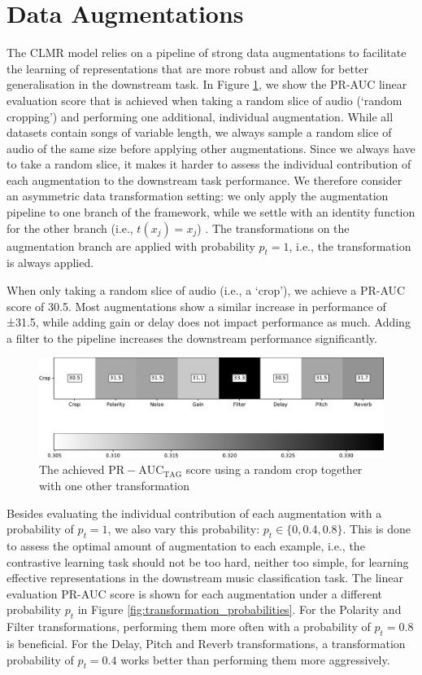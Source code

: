 \section{Data Augmentations}\label{sec:data_augmentations}
The CLMR model relies on a pipeline of strong data augmentations to facilitate the learning of representations that are more robust and allow for better generalisation in the downstream task.
In Figure \ref{fig:transformation_study}, we show the PR-AUC linear evaluation score that is achieved when taking a random slice of audio (`random cropping') and performing one additional, individual augmentation.
While all datasets contain songs of variable length, we always sample a random slice of audio of the same size before applying other augmentations.
Since we always have to take a random slice, it makes it harder to assess the individual contribution of each augmentation to the downstream task performance.
We therefore consider an asymmetric data transformation setting: we only apply the augmentation pipeline to one branch of the framework, while we settle with an identity function for the other branch (i.e., $t(x_j) = x_j$) \cite{chen_simple_2020}. The transformations on the augmentation branch are applied with probability $p_t=1$, i.e., the transformation is always applied.

When only taking a random slice of audio (i.e., a `crop'), we achieve a PR-AUC score of 30.5.
Most augmentations show a similar increase in performance of ±31.5, while adding gain or delay does not impact performance as much.
Adding a filter to the pipeline increases the downstream performance significantly.

\begin{figure}[h]
    \centering
    \includegraphics[width=\columnwidth]{figs/transformation_study.pdf}
    \caption{The achieved $\mathrm{PR-AUC}_{\mathrm{TAG}}$ score using a random crop together with one other transformation}
    \label{fig:transformation_study}
\end{figure}

Besides evaluating the individual contribution of each augmentation with a probability of $p_t = 1$, we also vary this probability: $p_t \in \{ 0, 0.4, 0.8 \}$.
This is done to assess the optimal amount of augmentation to each example, i.e., the contrastive learning task should not be too hard, neither too simple, for learning effective representations in the downstream music classification task.
The linear evaluation PR-AUC score is shown for each augmentation under a different probability $p_t$ in Figure \ref{fig:transformation_probabilities}. For the Polarity and Filter transformations, performing them more often with a probability of $p_t = 0.8$ is beneficial. For the Delay, Pitch and Reverb transformations, a transformation probability of $p_t = 0.4$ works better than performing them more aggressively. 

